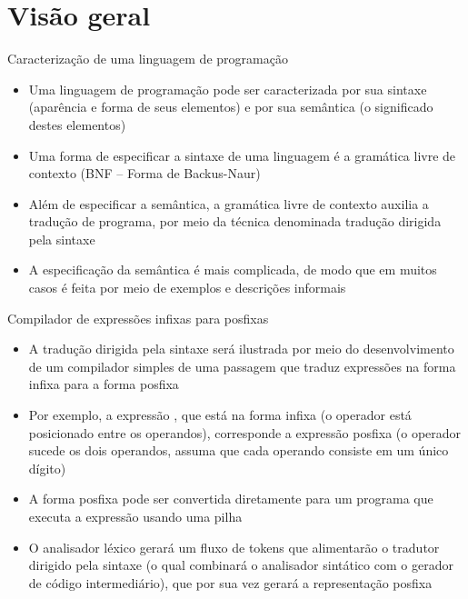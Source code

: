 \section{Visão geral}

\begin{frame}[fragile]{Caracterização de uma linguagem de programação}

    \begin{itemize}
        \item Uma linguagem de programação pode ser caracterizada por sua sintaxe (aparência e forma de seus elementos) e por sua semântica (o significado destes
            elementos)

        \item Uma forma de especificar a sintaxe de uma linguagem é a gramática livre de contexto (BNF -- Forma de Backus-Naur)

        \item Além de especificar a semântica, a gramática livre de contexto auxilia a tradução de programa, por meio da técnica denominada tradução dirigida
            pela sintaxe

        \item A especificação da semântica é mais complicada, de modo que em muitos casos é feita por meio de exemplos e descrições informais
    \end{itemize}

\end{frame}

\begin{frame}[fragile]{Compilador de expressões infixas para posfixas}

    \begin{itemize}
        \item A tradução dirigida pela sintaxe será ilustrada por meio do desenvolvimento de um compilador simples de uma passagem que traduz expressões
            na forma infixa para a forma posfixa

        \item Por exemplo, a expressão , que está na forma infixa (o operador está posicionado entre os operandos), corresponde a expressão
            posfixa  (o operador sucede os dois operandos, assuma que cada operando consiste em um único dígito)

        \item A forma posfixa pode ser convertida diretamente para um programa que executa a expressão usando uma pilha

        \item O analisador léxico gerará um fluxo de tokens que alimentarão o tradutor dirigido pela sintaxe (o qual combinará o analisador sintático com o gerador
            de código intermediário), que por sua vez gerará a representação posfixa
    \end{itemize}

\end{frame}


